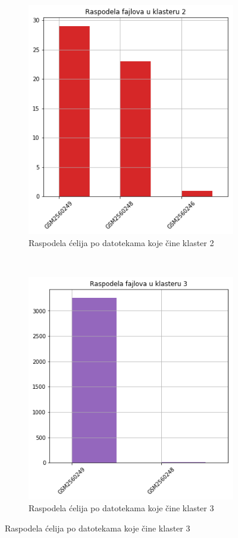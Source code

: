 \documentclass[a4paper]{article}
\begin{document}
\begin{figure}[H]
\begin{subfigure}[normla]{0.3\textwidth}
		\label{bar_spektral_cosine_klaster1}
	\end{subfigure}
	~
	\begin{subfigure}[normla]{0.3\textwidth}
		\includegraphics[scale=0.3]{bar_spektral_cosine_klaster2}
		\caption{Raspodela ćelija po datotekama koje čine klaster 2}
		\label{bar_spektral_cosine_klaster2}
	\end{subfigure}
	~
	\begin{subfigure}[normla]{0.3\textwidth}
		\includegraphics[scale=0.3]{bar_spektral_cosine_klaster3}
		\caption{Raspodela ćelija po datotekama koje čine klaster 3}

\end{subfigure}
\end{figure}
\end{document}
